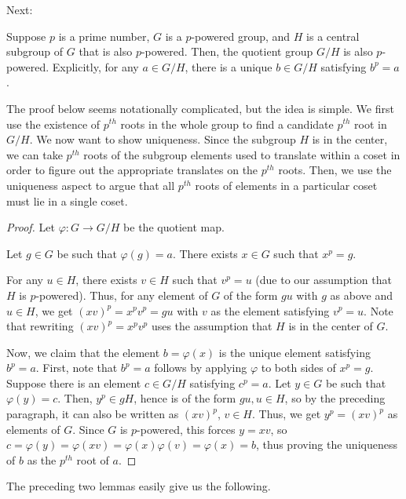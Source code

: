 Next:

\begin{lemma}\label{lemma:picentralimpliesqpi}
  Suppose $p$ is a prime number, $G$ is a $p$-powered group, and $H$
  is a central subgroup of $G$ that is also $p$-powered. Then, the
  quotient group $G/H$ is also $p$-powered. Explicitly, for any $a \in
  G/H$, there is a unique $b \in G/H$ satisfying $b^p = a$.
\end{lemma}

The proof below seems notationally complicated, but the idea is
simple. We first use the existence of $p^{th}$ roots in the whole
group to find a candidate $p^{th}$ root in $G/H$. We now want to show
uniqueness. Since the subgroup $H$ is in the center, we can take
$p^{th}$ roots of the subgroup elements used to translate within a
coset in order to figure out the appropriate translates on the
$p^{th}$ roots. Then, we use the uniqueness aspect to argue that all
$p^{th}$ roots of elements in a particular coset must lie in a single
coset.

\begin{proof}
  Let $\varphi:G \to G/H$ be the quotient map.

  Let $g \in G$ be such that $\varphi(g) = a$. There exists $x \in G$ such that $x^p = g$.

  For any $u \in H$, there exists $v \in H$ such that $v^p = u$ (due
  to our assumption that $H$ is $p$-powered). Thus, for any element of
  $G$ of the form $gu$ with $g$ as above and $u \in H$, we get $(xv)^p
  = x^pv^p = gu$ with $v$ as the element satisfying $v^p = u$. Note
  that rewriting $(xv)^p = x^pv^p$ uses the assumption that $H$ is
  in the center of $G$.

  Now, we claim that the element $b = \varphi(x)$ is the unique element
  satisfying $b^p = a$. First, note that $b^p = a$ follows by applying
  $\varphi$ to both sides of $x^p = g$. Suppose there is an element $c \in
  G/H$ satisfying $c^p = a$. Let $y \in G$ be such that $\varphi(y) =
  c$. Then, $y^p \in gH$, hence is of the form $gu, u \in H$, so by
  the preceding paragraph, it can also be written as $(xv)^p$, $v \in
  H$. Thus, we get $y^p = (xv)^p$ as elements of $G$. Since $G$ is
  $p$-powered, this forces $y = xv$, so $c = \varphi(y) = \varphi(xv) =
  \varphi(x)\varphi(v) = \varphi(x) = b$, thus proving the uniqueness of $b$ as
  the $p^{th}$ root of $a$.
\end{proof}

The preceding two lemmas easily give us the following.

